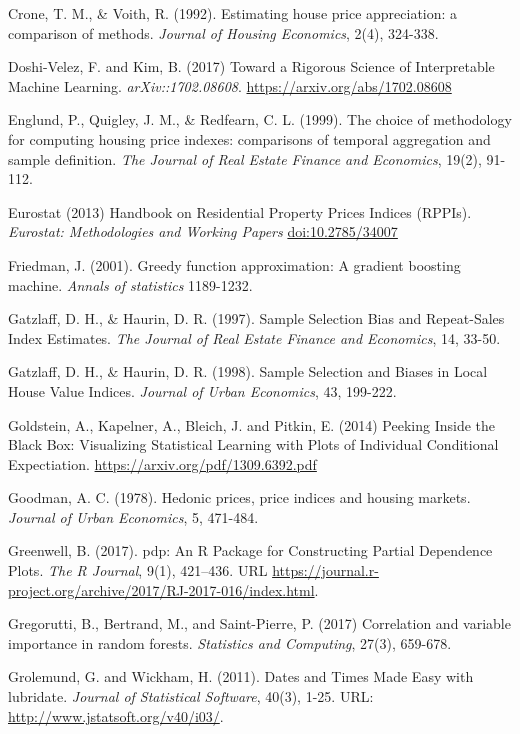 \documentclass[
]{article}
\begin{document}
Crone, T. M., \& Voith, R. (1992). Estimating house price appreciation:
a comparison of methods. \emph{Journal of Housing Economics}, 2(4),
324-338.

Doshi-Velez, F. and Kim, B. (2017) Toward a Rigorous Science of
Interpretable Machine Learning. \emph{arXiv::1702.08608}.
\url{https://arxiv.org/abs/1702.08608}

Englund, P., Quigley, J. M., \& Redfearn, C. L. (1999). The choice of
methodology for computing housing price indexes: comparisons of temporal
aggregation and sample definition. \emph{The Journal of Real Estate
Finance and Economics}, 19(2), 91-112.

Eurostat (2013) Handbook on Residential Property Prices Indices (RPPIs).
\emph{Eurostat: Methodologies and Working Papers}
\href{https://op.europa.eu/en/publication-detail/-/publication/cee09dbc-bf48-4126-a7d1-0bb9c028f648/language-en}{doi:10.2785/34007}

Friedman, J. (2001). Greedy function approximation: A gradient boosting
machine. \emph{Annals of statistics} 1189-1232.

Gatzlaff, D. H., \& Haurin, D. R. (1997). Sample Selection Bias and
Repeat-Sales Index Estimates. \emph{The Journal of Real Estate Finance
and Economics}, 14, 33-50.

Gatzlaff, D. H., \& Haurin, D. R. (1998). Sample Selection and Biases in
Local House Value Indices. \emph{Journal of Urban Economics}, 43,
199-222.

Goldstein, A., Kapelner, A., Bleich, J. and Pitkin, E. (2014) Peeking
Inside the Black Box: Visualizing Statistical Learning with Plots of
Individual Conditional Expectiation.
\href{arxiv.org/pdf/1309.6392.pdf}{https://arxiv.org/pdf/1309.6392.pdf}

Goodman, A. C. (1978). Hedonic prices, price indices and housing
markets. \emph{Journal of Urban Economics}, 5, 471-484.

Greenwell, B. (2017). pdp: An R Package for Constructing Partial
Dependence Plots. \emph{The R Journal}, 9(1), 421--436. URL
\url{https://journal.r-project.org/archive/2017/RJ-2017-016/index.html}.

Gregorutti, B., Bertrand, M., and Saint-Pierre, P. (2017) Correlation
and variable importance in random forests. \emph{Statistics and
Computing}, 27(3), 659-678.

Grolemund, G. and Wickham, H. (2011). Dates and Times Made Easy with
lubridate. \emph{Journal of Statistical Software}, 40(3), 1-25. URL:
\url{http://www.jstatsoft.org/v40/i03/}.
\end{document}
